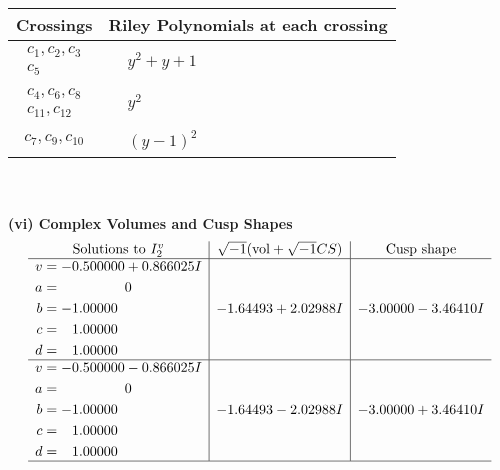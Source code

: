 \documentclass[1p]{elsarticle_modified}
\theoremstyle{definition}
\newcommand{\I}{\sqrt{-1}}
\begin{document}
\begin{tabular}{m{50pt}|m{274pt}}
Crossings & \hspace{64pt}Riley Polynomials at each crossing \\
\hline $$\begin{aligned}c_{1},c_{2},c_{3}\\c_{5}\end{aligned}$$&$\begin{aligned}
&y^2+y+1
\end{aligned}$\\
\hline $$\begin{aligned}c_{4},c_{6},c_{8}\\c_{11},c_{12}\end{aligned}$$&$\begin{aligned}
&y^2
\end{aligned}$\\
\hline $$\begin{aligned}c_{7},c_{9},c_{10}\end{aligned}$$&$\begin{aligned}
&(y-1)^2
\end{aligned}$\\
\hline
\end{tabular}\\~\\
\newpage\flushleft \textbf{(vi) Complex Volumes and Cusp Shapes}
$$\begin{array}{c|c|c}  
\text{Solutions to }I^v_{2}& \I (\text{vol} + \sqrt{-1}CS) & \text{Cusp shape}\\
 \hline 
\begin{aligned}
v &= -0.500000 + 0.866025 I \\
a &= \phantom{-0.000000 } 0 \\
b &= -1.00000\phantom{ +0.000000I} \\
c &= \phantom{-}1.00000\phantom{ +0.000000I} \\
d &= \phantom{-}1.00000\phantom{ +0.000000I}\end{aligned}
 & -1.64493 + 2.02988 I & -3.00000 - 3.46410 I \\ \hline\begin{aligned}
v &= -0.500000 - 0.866025 I \\
a &= \phantom{-0.000000 } 0 \\
b &= -1.00000\phantom{ +0.000000I} \\
c &= \phantom{-}1.00000\phantom{ +0.000000I} \\
d &= \phantom{-}1.00000\phantom{ +0.000000I}\end{aligned}
 & -1.64493 - 2.02988 I & -3.00000 + 3.46410 I\\
 \hline 
 \end{array}$$\newpage\newpage\renewcommand{\arraystretch}{1}
\end{document}

